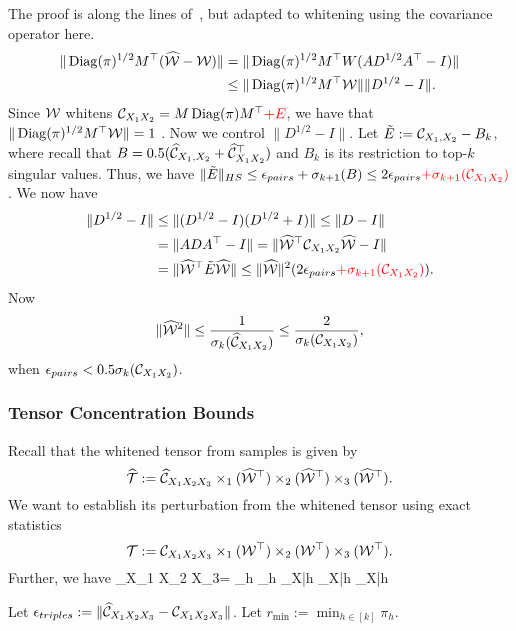 \bprf The proof is along the lines of~\cite[Lemma 16]{AnandkumarEtal:community12}, but adapted to whitening using the covariance operator here.
 \begin{align*}\|\operatorname{Diag}(\pi)^{1/2} M^\top(\widehat{\mathcal{W}}-\mathcal{W})\|&=
\|\operatorname{Diag}(\pi)^{1/2} M^\top W(A D^{1/2} A^\top -I)\|\\ &\leq\|\operatorname{Diag}(\pi)^{1/2} M^\top \mathcal{W}\| \|D^{1/2}-I\|. \end{align*} Since $\mathcal{W}$ whitens $\mathcal{C}_{X_1 X_2}=M \operatorname{Diag}(\pi) M^\top\textcolor{red}{+E}$, we have that $\|\operatorname{Diag}(\pi)^{1/2} M^\top \mathcal{W}\|=1$ . Now we control $\|D^{1/2}-I\|$.  Let $\tilde{E}:= \mathcal{C}_{X_1,X_{2}} -B_k$, where recall that $B=0.5( \widehat {\mathcal{C}}_{X_1,X_{2}}+ \widehat{\mathcal{C}}_{X_1 X_2}^\top)$ and $B_k$ is its restriction to top-$k$ singular values. Thus, we have $\|\tilde{E}\|_{HS} \leq \epsilon_{pairs} + \sigma_{k+1}(B)\leq 2\epsilon_{pairs}\textcolor{red}{+\sigma_{k+1}(\mathcal{C}_{X_1 X_2})} $.
 We now have
\begin{align*}
\|D^{1/2}-I\|&\leq \|(D^{1/2}-I)(D^{1/2}+I)\|\leq \|D-I\|
\\ &=\|AD A^\top - I\| = \|\widehat{\mathcal{W}}^\top \mathcal{C}_{X_1 X_2}  \widehat{\mathcal{W}} -I\|\\ &=\| \widehat{\mathcal{W}}^\top  \tilde{E} \widehat{\mathcal{W}}\| \leq \|\widehat{\mathcal{W}}\|^2 ( 2 \epsilon_{pairs}\textcolor{red}{+\sigma_{k+1}(\mathcal{C}_{X_1 X_2})}).
\end{align*}Now
\[ \|\widehat{\mathcal{W}}^2\| \leq\frac{1}{ \sigma_k(\widehat{\mathcal{C}}_{X_1 X_2})}\leq \frac{2}{\sigma_k(\mathcal{C}_{X_1 X_2})},\] when  $\epsilon_{pairs}<0.5 \sigma_k(\mathcal{C}_{X_1 X_2})$.
\eprf

\subsubsection{Tensor Concentration Bounds}

Recall that the whitened tensor from samples is given by
$$\widehat{{\mathcal{T}}} := \widehat{\mathcal{C}}_{X_1 X_2 X_3} \times_1 (\widehat{\mathcal{W}}^\top) \times_2 (\widehat{\mathcal{W}}^\top) \times_3 (\widehat{\mathcal{W}}^\top).$$ We want to establish its perturbation from the whitened tensor using exact statistics
$${\mathcal{T}} := \mathcal{C}_{X_1 X_2 X_3} \times_1 (\mathcal{W}^\top ) \times_2 (\mathcal{W}^\top ) \times_3 (\mathcal{W}^\top ).$$ Further, we have
\beq\label{eqn:triplesexpression}\Ccal_{X_1 X_2 X_3}= \sum_{h\in [k]} \pi_h \cdot \mu_{X|h} \otimes \mu_{X|h} \otimes \mu_{X|h} \eeq

Let $\epsilon_{triples}:= \|\widehat{\mathcal{C}}_{X_1 X_2 X_3}-\mathcal{C}_{X_1 X_2 X_3}\|_{}$. Let $r_{\min}:=\min_{h\in [k]}\pi_h$.

